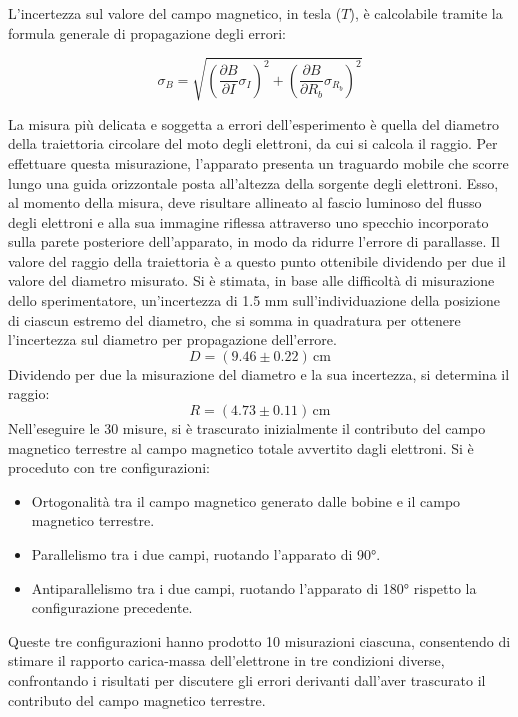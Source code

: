 \documentclass[a4paper,12pt]{article}
\begin{document}
L’incertezza sul valore del campo magnetico, in tesla (\( T \)), è calcolabile tramite la formula generale di propagazione degli errori:

\begin{equation}
    \sigma_B = \sqrt{\left( \frac{\partial B}{\partial I} \sigma_I \right)^2 + \left( \frac{\partial B}{\partial R_b} \sigma_{R_b} \right)^2}
    \label{eq:incertezza_campo_magnetico}
\end{equation}

La misura più delicata e soggetta a errori dell’esperimento è quella del diametro della traiettoria circolare del moto degli elettroni, da cui si calcola il raggio. Per effettuare questa misurazione, l’apparato presenta un traguardo mobile che scorre lungo una guida orizzontale posta all’altezza della sorgente degli elettroni. Esso, al momento della misura, deve risultare allineato al fascio luminoso del flusso degli elettroni e alla sua immagine riflessa attraverso uno specchio incorporato sulla parete posteriore dell’apparato, in modo da ridurre l’errore di parallasse.
Il valore del raggio della traiettoria è a questo punto ottenibile dividendo per due il valore del diametro misurato. Si è stimata, in base alle difficoltà di misurazione dello sperimentatore, un'incertezza di 1.5 mm sull'individuazione della posizione di ciascun estremo del diametro, che si somma in quadratura per ottenere l'incertezza sul diametro per propagazione dell'errore. 
\begin{equation}
    D = (9.46 \pm 0.22) \, \text{cm}
    \label{eq:diametro_traiettoria}
\end{equation}
Dividendo per due la misurazione del diametro e la sua incertezza, si determina il raggio:
\begin{equation}
    R = (4.73 \pm 0.11) \, \text{cm}
    \label{eq:raggio_traiettoria}
\end{equation}
Nell’eseguire le 30 misure, si è trascurato inizialmente il contributo del campo magnetico terrestre al campo magnetico totale avvertito dagli elettroni. Si è proceduto con tre configurazioni:
\begin{itemize}
    \item Ortogonalità tra il campo magnetico generato dalle bobine e il campo magnetico terrestre.
    \item Parallelismo tra i due campi, ruotando l'apparato di 90°.
    \item Antiparallelismo tra i due campi, ruotando l’apparato di 180° rispetto la configurazione precedente.
\end{itemize}
Queste tre configurazioni hanno prodotto 10 misurazioni ciascuna, consentendo di stimare il rapporto carica-massa dell’elettrone in tre condizioni diverse, confrontando i risultati per discutere gli errori derivanti dall'aver trascurato il contributo del campo magnetico terrestre.
\end{document}
